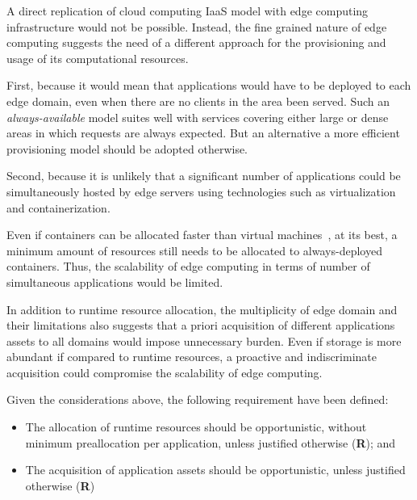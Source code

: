 


A direct replication of cloud computing IaaS model with edge computing infrastructure would not be possible. Instead, the fine grained nature of edge computing suggests the need of a different approach for the provisioning and usage of its computational resources. 

First, because it would mean that applications would have to be deployed to each edge domain, even when there are no clients in the area been served. Such an \textit{always-available} model suites well with services covering either large or dense areas in which requests are always expected. But an alternative a more efficient provisioning model should be adopted otherwise.

Second, because it is unlikely that a significant number of applications could be simultaneously hosted by edge servers using technologies such as virtualization and containerization. 

Even if containers can be allocated faster than virtual machines~\cite{Giovanni?}, at its best, a minimum amount of resources still needs to be allocated to always-deployed containers. Thus, the scalability of edge computing in terms of number of simultaneous applications would be limited. 
	
In addition to runtime resource allocation, the multiplicity of edge domain and their limitations also suggests that a priori acquisition of different applications assets to all domains would impose unnecessary burden. Even if storage is more abundant if compared to runtime resources, a proactive and indiscriminate acquisition could compromise the scalability of edge computing.

\noindent Given the considerations above, 
the following requirement have been defined:

\begin{itemize}

	\item The allocation of runtime resources should be opportunistic, without minimum preallocation per application, unless justified otherwise (\textbf{R}); and
	
	\item The acquisition of application assets should be opportunistic, unless justified otherwise (\textbf{R})

\end{itemize} 

